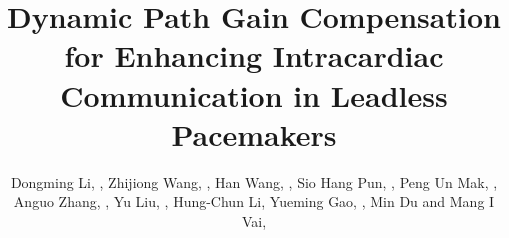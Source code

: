 \documentclass[journal]{IEEEtran}
\begin{document}
\title{Dynamic Path Gain Compensation for Enhancing Intracardiac Communication in Leadless Pacemakers}

\author{
  Dongming Li, ,
 Zhijiong Wang, ,
  Han Wang, ,
  Sio Hang Pun, ,
  Peng Un Mak, ,
  Anguo Zhang, ,
  Yu Liu, ,
  Hung-Chun Li,
  Yueming Gao, ,
  Min Du and Mang I Vai, 

}


\maketitle
\end{document}

